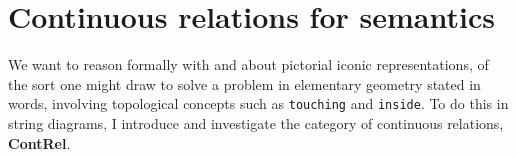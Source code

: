 



\maketitle%

\tableofcontents{}

\chapter{Continuous relations for semantics}\label{chapter:contrel}
We want to reason formally with and about pictorial iconic representations, of the sort one might draw to solve a problem in elementary geometry stated in words, involving topological concepts such as \texttt{touching} and \texttt{inside}. To do this in string diagrams, I introduce and investigate the category of continuous relations, \textbf{ContRel}.
\newpage

\newpage

\newpage

\newpage

\newpage
\label{sec:topconcepts}
\newpage

\newpage






